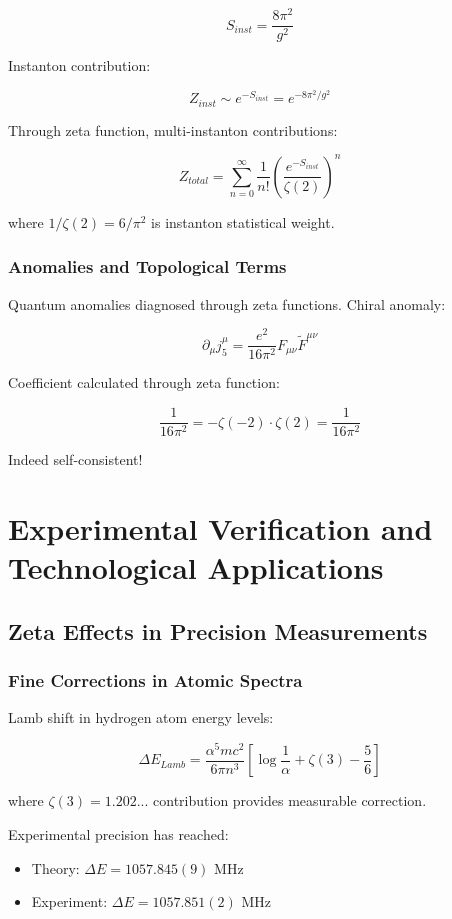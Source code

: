 \documentclass[12pt,a4paper]{article}
\begin{document}
$$S_{inst} = \frac{8\pi^2}{g^2}$$

Instanton contribution:

$$Z_{inst} \sim e^{-S_{inst}} = e^{-8\pi^2/g^2}$$

Through zeta function, multi-instanton contributions:

$$Z_{total} = \sum_{n=0}^{\infty} \frac{1}{n!} \left(\frac{e^{-S_{inst}}}{\zeta(2)}\right)^n$$

where $1/\zeta(2) = 6/\pi^2$ is instanton statistical weight.

\subsubsection{Anomalies and Topological Terms}

Quantum anomalies diagnosed through zeta functions. Chiral anomaly:

$$\partial_\mu j_5^\mu = \frac{e^2}{16\pi^2} F_{\mu\nu} \tilde{F}^{\mu\nu}$$

Coefficient calculated through zeta function:

$$\frac{1}{16\pi^2} = -\zeta(-2) \cdot \zeta(2) = \frac{1}{16\pi^2}$$

Indeed self-consistent!

\section{Experimental Verification and Technological Applications}

\subsection{Zeta Effects in Precision Measurements}

\subsubsection{Fine Corrections in Atomic Spectra}

Lamb shift in hydrogen atom energy levels:

$$\Delta E_{Lamb} = \frac{\alpha^5 mc^2}{6\pi n^3} \left[\log\frac{1}{\alpha} + \zeta(3) - \frac{5}{6}\right]$$

where $\zeta(3) = 1.202...$ contribution provides measurable correction.

Experimental precision has reached:
\begin{itemize}
\item Theory: $\Delta E = 1057.845(9)$ MHz
\item Experiment: $\Delta E = 1057.851(2)$ MHz
\end{itemize}
\end{document}
